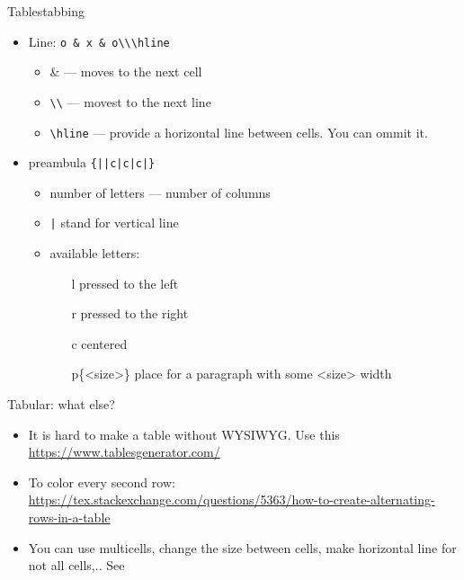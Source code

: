 \begin{frame}[fragile]{Tables}{tabbing}\relax
     \begin{itemize}
         \item Line: \verb!o & x & o\\\hline!
         \begin{itemize}
             \item {\csk \&} --- moves to the next cell 
             \item {\csk \verb!\\!} --- movest to the next line 
             \item {\csk \verb!\hline!} --- provide a horizontal line between cells. You can ommit it.
         \end{itemize}
         \item preambula {\csk \verb!{||c|c|c|}!} 
         \begin{itemize}
             \item number of letters --- number of columns
             \item {\csk \verb!|!} stand for vertical line 
             \item available letters:
             \begin{itemize}
                 \item[l] pressed to the left
                 \item[r] pressed to the right
                 \item[c] centered
                 \item[p\{<size>\}] place for a paragraph with some <size> width 
             \end{itemize}
         \end{itemize}
     \end{itemize}
\end{frame}

\begin{frame}[fragile]{Tabular: what else?}
     \begin{itemize}
         \item It is hard to make a table without WYSIWYG. Use this \url{https://www.tablesgenerator.com/}
         \item To color every second row: \url{https://tex.stackexchange.com/questions/5363/how-to-create-alternating-rows-in-a-table}
         \item You can use multicells, change the size between cells, make horizontal line for not all cells,.. See 
          
     \end{itemize}
\end{frame}